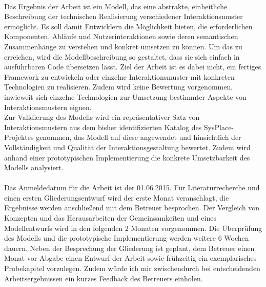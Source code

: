 \documentclass[11pt,a4paper]{article}
\begin{document}
\paragraph{}
Das Ergebnis der Arbeit ist ein Modell, das eine abstrakte, einheitliche Beschreibung der technischen Realisierung verschiedener Interaktionsmuster ermöglicht. Es soll damit Entwicklern die Möglichkeit bieten, die erforderlichen Komponenten, Abläufe und Nutzerinteraktionen sowie deren semantischen Zusammenhänge zu verstehen und konkret umsetzen zu können. Um das zu erreichen, wird die Modellbeschreibung so gestaltet, dass sie sich einfach in ausführbaren Code übersetzen lässt. Ziel der Arbeit ist es dabei nicht, ein fertiges Framework zu entwickeln oder einzelne Interaktionsmuster mit konkreten Technologien zu realisieren. Zudem wird keine Bewertung vorgenommen, inwieweit sich einzelne Technologien zur Umsetzung bestimmter Aspekte von Interaktionsmustern eignen. \\
Zur Validierung des Modells wird ein repräsentativer Satz von Interaktionsmustern aus dem bisher identifizierten Katalog des SysPlace-Projektes genommen, das Modell auf diese angewendet und hinsichtlich der Vollständigkeit und Qualität der Interaktionsgestaltung bewertet. Zudem wird anhand einer prototypischen Implementierung die konkrete Umsetzbarkeit des Modells analysiert.

\paragraph{}
Das Anmeldedatum für die Arbeit ist der 01.06.2015. Für Literaturrecherche und einen ersten Gliederungsentwurf wird der erste Monat veranschlagt, die Ergebnisse werden anschließend mit dem Betreuer besprochen. Der Vergleich von Konzepten und das Herausarbeiten der Gemeinsamkeiten und eines Modellentwurfs wird in den folgenden 2 Monaten vorgenommen. Die Überprüfung des Modells und die prototypische Implementierung werden weitere 6 Wochen dauern. 
Neben der Besprechung der Gliederung ist geplant, dem Betreuer einen Monat vor Abgabe  einen Entwurf der Arbeit sowie frühzeitig ein exemplarisches Probekapitel vorzulegen. Zudem würde ich mir zwischendurch bei entscheidenden Arbeitsergebnissen ein kurzes Feedback des Betreuers einholen.
\end{document}
